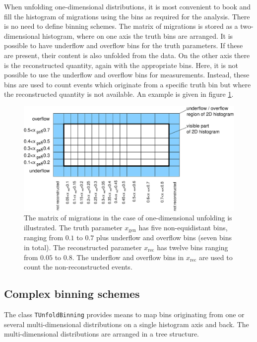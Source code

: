 \documentclass[12pt]{article}
\newlength{\figwidth}
\begin{document}
When unfolding one-dimensional distributions, it is most convenient to
book and fill the histogram of migrations using the bins as required for the
analysis. There is no need to define binning schemes.
The matrix of migrations is stored as a two-dimensional histogram, where on
one axis the truth bins are arranged. It is possible to have underflow
and overflow bins for the truth parameters. If these are present,
their content is also unfolded from the data.
On the other axis there is the reconstructed quantity, again with the
appropriate bins. Here, it is not possible to use the underflow and overflow
bins for measurements. Instead, these bins are used to count events
which originate from a specific truth bin but where the reconstructed quantity
is not available. An example is given in figure \ref{fig:unfold1dim}.
\begin{figure}
\begin{center}
\includegraphics[width=0.7\figwidth]{tunfold_manual_fig2.eps}
\end{center}
\caption{\label{fig:unfold1dim} The matrix of migrations in the case of
  one-dimensional unfolding 
  is illustrated. The truth parameter $x_{\text{gen}}$ has five
  non-equidistant bins, 
  ranging from $0.1$ to $0.7$ plus underflow and overflow bins (seven bins in
  total).
  The reconstructed parameter $x_{\text{rec}}$ has twelve
  bins ranging from $0.05$ to $0.8$. The underflow and overflow bins in
  $x_{\text{rec}}$ are used to count the non-reconstructed events.
}
\end{figure}

\subsection{Complex binning schemes}

The class {\tt TUnfoldBinning} provides means to map bins originating from 
one or several multi-dimensional distributions on a single histogram
axis and back. The multi-dimensional distributions are arranged in a
tree structure.
\end{document}
